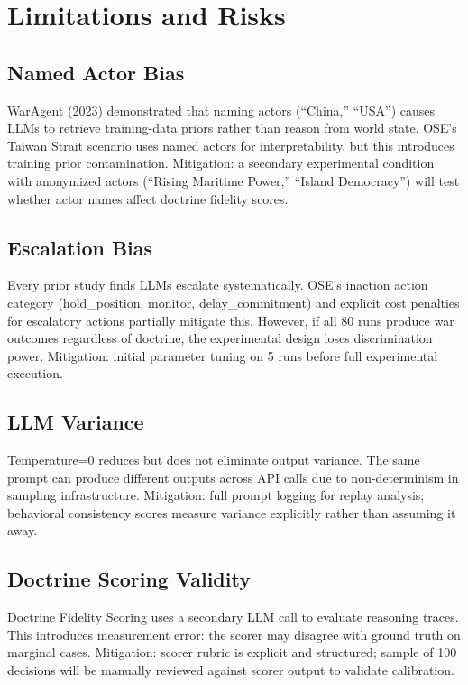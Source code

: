 \documentclass[12pt, a4paper]{article}
\begin{document}
\section{Limitations and Risks}

\subsection{Named Actor Bias}

WarAgent (2023) demonstrated that naming actors (``China,'' ``USA'') causes LLMs to retrieve training-data priors rather than reason from world state. OSE's Taiwan Strait scenario uses named actors for interpretability, but this introduces training prior contamination. Mitigation: a secondary experimental condition with anonymized actors (``Rising Maritime Power,'' ``Island Democracy'') will test whether actor names affect doctrine fidelity scores.

\subsection{Escalation Bias}

Every prior study finds LLMs escalate systematically. OSE's inaction action category (hold\_position, monitor, delay\_commitment) and explicit cost penalties for escalatory actions partially mitigate this. However, if all 80 runs produce war outcomes regardless of doctrine, the experimental design loses discrimination power. Mitigation: initial parameter tuning on 5 runs before full experimental execution.

\subsection{LLM Variance}

Temperature=0 reduces but does not eliminate output variance. The same prompt can produce different outputs across API calls due to non-determinism in sampling infrastructure. Mitigation: full prompt logging for replay analysis; behavioral consistency scores measure variance explicitly rather than assuming it away.

\subsection{Doctrine Scoring Validity}

Doctrine Fidelity Scoring uses a secondary LLM call to evaluate reasoning traces. This introduces measurement error: the scorer may disagree with ground truth on marginal cases. Mitigation: scorer rubric is explicit and structured; sample of 100 decisions will be manually reviewed against scorer output to validate calibration.
\end{document}
